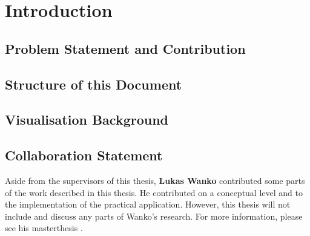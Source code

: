 \section{Introduction}

\subsection{Problem Statement and Contribution}

\subsection{Structure of this Document}

\subsection{Visualisation Background}


\subsection{Collaboration Statement}
\label{s:collaboration-statement}
Aside from the supervisors of this thesis, \textbf{Lukas Wanko} contributed some parts of the work described in this thesis. He contributed on a conceptual level and to the implementation of the practical application. However, this thesis will not include and discuss any parts of Wanko's research. For more information, please see his masterthesis .